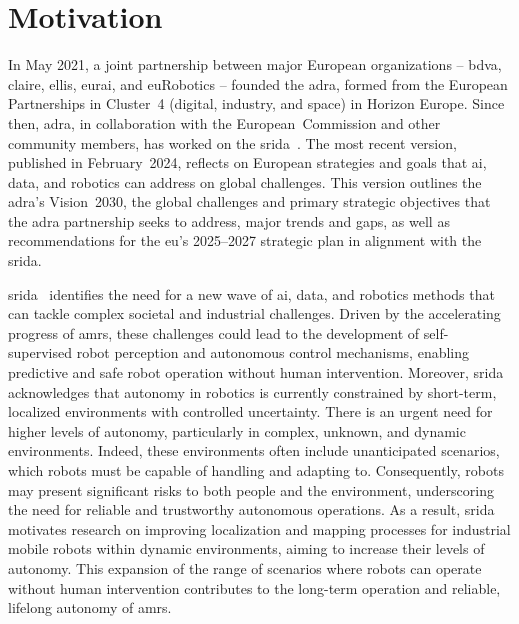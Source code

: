 
\section{Motivation}\label{sec:intro:motivation}

In May 2021, a joint partnership between major European organizations --
\gls{bdva}, \gls{claire}, \gls{ellis}, \gls{eurai}, and euRobotics -- founded
the \gls{adra}, formed from the European Partnerships in Cluster~4
(digital, industry, and space) in Horizon Europe.
Since then, \gls{adra}, in collaboration with the European~Commission and other
community members, has worked on the \gls{srida}~\cite{adra:tech-report:2024}.
The most recent version, published in February~2024, reflects on European
strategies and goals that \gls{ai}, data, and robotics can address on global
challenges. This version outlines the \gls{adra}'s Vision~2030, the global
challenges and primary strategic objectives that the \gls{adra} partnership
seeks to address, major trends and gaps, as well as recommendations for the
\gls{eu}'s 2025--2027 strategic plan in alignment with the \gls{srida}.

\gls{srida}~\cite{adra:tech-report:2024} identifies the need for a new wave of
\gls{ai}, data, and robotics methods that can tackle complex societal and
industrial challenges. Driven by the accelerating progress of \glspl{amr}, these
challenges could lead to the development of self-supervised robot perception and
autonomous control mechanisms, enabling predictive and safe robot operation
without human intervention.
Moreover, \gls{srida} acknowledges that autonomy in robotics is currently
constrained by short-term, localized environments with controlled uncertainty.
There is an urgent need for higher levels of autonomy, particularly in complex,
unknown, and dynamic environments. Indeed, these environments often include
unanticipated scenarios, which robots must be capable of handling and
adapting to. Consequently, robots may present significant risks to both people
and the environment, underscoring the need for reliable and trustworthy
autonomous operations.
As a result, \gls{srida} motivates research on improving localization and
mapping processes for industrial mobile robots within dynamic environments,
aiming to increase their levels of autonomy.
This expansion of the range of scenarios where robots can operate without human
intervention contributes to the long-term operation and reliable,
lifelong autonomy of \glspl{amr}.

